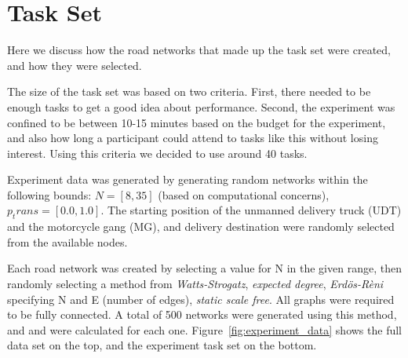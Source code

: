 \section{Task Set}
Here we discuss how the road networks that made up the task set were created, and how they were selected.

The size of the task set was based on two criteria. First, there needed to be enough tasks to get a good idea about performance. Second, the experiment was confined to be between 10-15 minutes based on the budget for the experiment, and also how long a participant could attend to tasks like this without losing interest. Using this criteria we decided to use around 40 tasks.

Experiment data was generated by generating random networks within the following bounds: $N = [8,35]$ (based on computational concerns), $p_trans=[0.0,1.0]$. The starting position of the unmanned delivery truck (UDT) and the motorcycle gang (MG), and delivery destination were randomly selected from the available nodes.

Each road network was created by selecting a value for N in the given range, then randomly selecting a method from \emph{Watts-Strogatz}, \emph{expected degree}, \emph{Erd\"{o}s-R\`{e}ni} specifying N and E (number of edges), \emph{static scale free}. All graphs were required to be fully connected. A total of 500 networks were generated using this method, and \xQ{} and \xO{} were calculated for each one. Figure~\ref{fig:experiment_data} shows the full data set on the top, and the experiment task set on the bottom.


